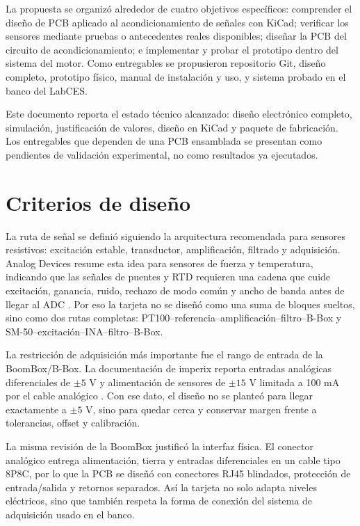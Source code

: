 \documentclass[conference]{IEEEtran}
\begin{document}
La propuesta se organizó alrededor de cuatro objetivos específicos: comprender el diseño de PCB aplicado al acondicionamiento de señales con KiCad; verificar los sensores mediante pruebas o antecedentes reales disponibles; diseñar la PCB del circuito de acondicionamiento; e implementar y probar el prototipo dentro del sistema del motor. Como entregables se propusieron repositorio Git, diseño completo, prototipo físico, manual de instalación y uso, y sistema probado en el banco del LabCES.

Este documento reporta el estado técnico alcanzado: diseño electrónico completo, simulación, justificación de valores, diseño en KiCad y paquete de fabricación. Los entregables que dependen de una PCB ensamblada se presentan como pendientes de validación experimental, no como resultados ya ejecutados.

\section{Criterios de diseño}

La ruta de señal se definió siguiendo la arquitectura recomendada para sensores resistivos: excitación estable, transductor, amplificación, filtrado y adquisición. Analog Devices resume esta idea para sensores de fuerza y temperatura, indicando que las señales de puentes y RTD requieren una cadena que cuide excitación, ganancia, ruido, rechazo de modo común y ancho de banda antes de llegar al ADC \cite{adi_paths}. Por eso la tarjeta no se diseñó como una suma de bloques sueltos, sino como dos rutas completas: PT100--referencia--amplificación--filtro--B-Box y SM-50--excitación--INA--filtro--B-Box.

La restricción de adquisición más importante fue el rango de entrada de la BoomBox/B-Box. La documentación de imperix reporta entradas analógicas diferenciales de $\pm5$ V y alimentación de sensores de $\pm15$ V limitada a 100 mA por el cable analógico \cite{imperix}. Con ese dato, el diseño no se planteó para llegar exactamente a $\pm5$ V, sino para quedar cerca y conservar margen frente a tolerancias, offset y calibración.

La misma revisión de la BoomBox justificó la interfaz física. El conector analógico entrega alimentación, tierra y entradas diferenciales en un cable tipo 8P8C, por lo que la PCB se diseñó con conectores RJ45 blindados, protección de entrada/salida y retornos separados. Así la tarjeta no solo adapta niveles eléctricos, sino que también respeta la forma de conexión del sistema de adquisición usado en el banco.
\end{document}
